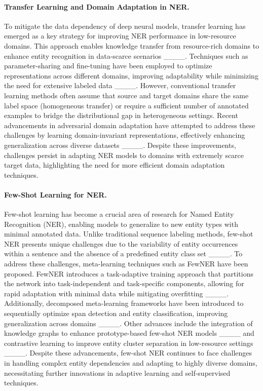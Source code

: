\paragraph{Transfer Learning and Domain Adaptation in NER.}  
To mitigate the data dependency of deep neural models, transfer learning has emerged as a key strategy for improving NER performance in low-resource domains. This approach enables knowledge transfer from resource-rich domains to enhance entity recognition in data-scarce scenarios ____. Techniques such as parameter-sharing and fine-tuning have been employed to optimize representations across different domains, improving adaptability while minimizing the need for extensive labeled data ____. However, conventional transfer learning methods often assume that source and target domains share the same label space (homogeneous transfer) or require a sufficient number of annotated examples to bridge the distributional gap in heterogeneous settings. Recent advancements in adversarial domain adaptation have attempted to address these challenges by learning domain-invariant representations, effectively enhancing generalization across diverse datasets ____. Despite these improvements, challenges persist in adapting NER models to domains with extremely scarce target data, highlighting the need for more efficient domain adaptation techniques.

\paragraph{Few-Shot Learning for NER.}  
Few-shot learning has become a crucial area of research for Named Entity Recognition (NER), enabling models to generalize to new entity types with minimal annotated data. Unlike traditional sequence labeling methods, few-shot NER presents unique challenges due to the variability of entity occurrences within a sentence and the absence of a predefined entity class set ____.
To address these challenges, meta-learning techniques such as FewNER have been proposed. FewNER introduces a task-adaptive training approach that partitions the network into task-independent and task-specific components, allowing for rapid adaptation with minimal data while mitigating overfitting ____. Additionally, decomposed meta-learning frameworks have been introduced to sequentially optimize span detection and entity classification, improving generalization across domains ____. Other advances include the integration of knowledge graphs to enhance prototype-based few-shot NER models ____ and contrastive learning to improve entity cluster separation in low-resource settings ____. Despite these advancements, few-shot NER continues to face challenges in handling complex entity dependencies and adapting to highly diverse domains, necessitating further innovations in adaptive learning and self-supervised techniques.

